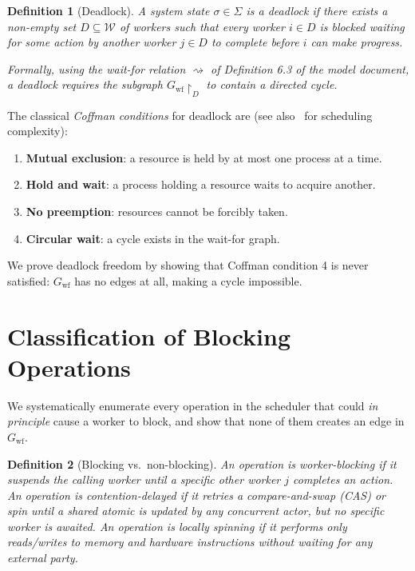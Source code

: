 \documentclass[11pt,a4paper]{article}
\newtheorem{definition}{Definition}[section]
\begin{document}
\begin{definition}[Deadlock]
\label{def:deadlock}
A system state $\sigma \in \Sigma$ is a \emph{deadlock} if there
exists a non-empty set $D \subseteq \mathcal{W}$ of workers such that
every worker $i \in D$ is blocked waiting for some action by another
worker $j \in D$ to complete before $i$ can make progress.

Formally, using the wait-for relation $\rightsquigarrow$ of
Definition 6.3 of the model document, a deadlock requires the
subgraph $G_{\text{wf}}\!\upharpoonright_D$ to contain a directed
cycle.
\end{definition}

The classical \emph{Coffman conditions} for deadlock are (see also~\cite{lenstra1978} for scheduling complexity):
\begin{enumerate}
  \item \textbf{Mutual exclusion}: a resource is held by at most one
        process at a time.
  \item \textbf{Hold and wait}: a process holding a resource waits to
        acquire another.
  \item \textbf{No preemption}: resources cannot be forcibly taken.
  \item \textbf{Circular wait}: a cycle exists in the wait-for graph.
\end{enumerate}

We prove deadlock freedom by showing that Coffman condition 4 is
never satisfied: $G_{\text{wf}}$ has no edges at all, making a
cycle impossible.

\section{Classification of Blocking Operations}

We systematically enumerate every operation in the scheduler that
could \emph{in principle} cause a worker to block, and show that none
of them creates an edge in $G_{\text{wf}}$.

\begin{definition}[Blocking vs.\ non-blocking]
An operation is \emph{worker-blocking} if it suspends the calling
worker until a \emph{specific other worker} $j$ completes an action.
An operation is \emph{contention-delayed} if it retries a
compare-and-swap (CAS) or spin until a shared atomic is updated by
\emph{any} concurrent actor, but no specific worker is awaited.
An operation is \emph{locally spinning} if it performs only
reads/writes to memory and hardware instructions without waiting for
any external party.
\end{definition}
\end{document}

